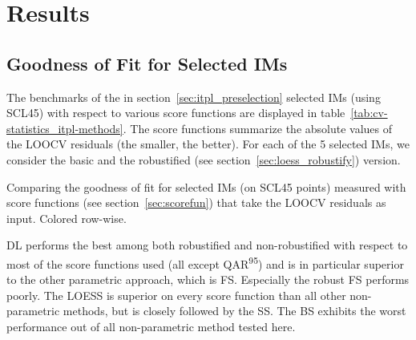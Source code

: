 \chapter{Results}\label{sec:results}

\section{Goodness of Fit for Selected {{IM}}s}{
	\label{sec:results_itpl}
	The benchmarks of the in section~\ref{sec:itpl_preselection} selected {{IM}}s (using SCL45) with respect to various score functions are displayed in table~\ref{tab:cv-statistics_itpl-methods}. The score functions summarize the absolute values of the LOOCV residuals (the smaller, the better). For each of the 5 selected {{IM}}s, we consider the basic and the robustified (see section~\ref{sec:loess_robustify}) version.

	\begin{table}[h]
		\begin{center}
			\caption[Goodness of fit for {{IM}}s (on SCL45 points) measured with score functions.]{Comparing the goodness of fit for selected {{IM}}s (on SCL45 points) measured with score functions (see section~\ref{sec:scorefun}) that take the LOOCV residuals as input. Colored row-wise.}
			\scriptsize
			
			\normalsize
			\label{tab:cv-statistics_itpl-methods}
		\end{center}
	\end{table}
	
	DL performs the best among both robustified and non-robustified with respect to most of the score functions used (all except QAR\textsuperscript{95}) and is in particular superior to the other parametric approach, which is FS. Especially the robust FS performs poorly. The LOESS is superior on every score function than all other non-parametric methods, but is closely followed by the SS. The BS exhibits the worst performance out of all non-parametric method tested here. 
}


